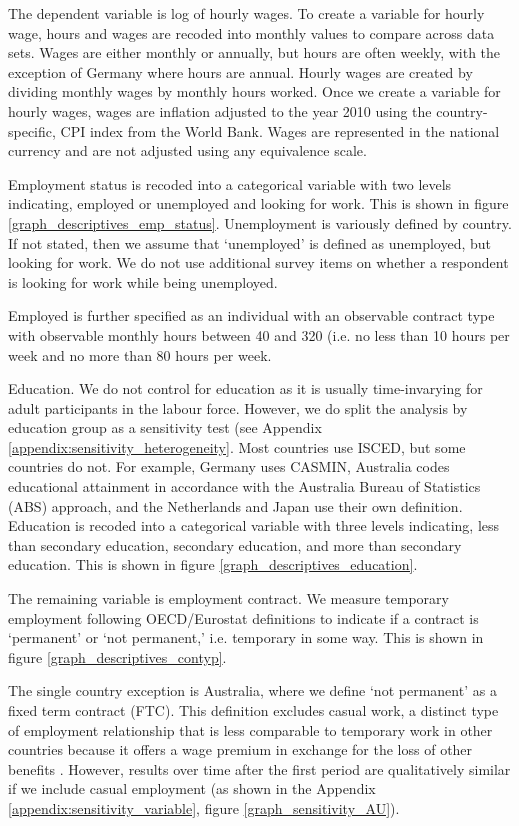 The dependent variable is log of hourly wages.  To create a variable for hourly wage, hours and wages are recoded into monthly values to compare across data sets.  Wages are either monthly or annually, but hours are often weekly, with the exception of Germany where hours are annual.  Hourly wages are created by dividing monthly wages by monthly hours worked.    Once we create a variable for hourly wages, wages are inflation adjusted to the year 2010 using the country-specific, CPI index from the World Bank.  Wages are represented in the national currency and are not adjusted using any equivalence scale.  

Employment status is recoded into a categorical variable with two levels indicating, employed or unemployed and looking for work.  This is shown in figure \ref{graph_descriptives_emp_status}.  Unemployment is variously defined by country.  If not stated, then we assume that `unemployed' is defined as unemployed, but looking for work.  We do not use additional survey items on whether a respondent is looking for work while being unemployed.  

Employed is further specified as an individual with an observable contract type with observable monthly hours between 40 and 320 (i.e. no less than 10 hours per week and no more than 80 hours per week.


Education.  We do not control for education as it is usually time-invarying for adult participants in the labour force.  However, we do split the analysis by education group as a sensitivity test (see Appendix \ref{appendix:sensitivity_heterogeneity}.  Most countries use ISCED, but some countries do not.  For example, Germany uses CASMIN, Australia codes educational attainment in accordance with the Australia Bureau of Statistics (ABS) approach, and the Netherlands and Japan use their own definition.  Education is recoded into a categorical variable with three levels indicating, less than secondary education, secondary education, and more than secondary education.  This is shown in figure \ref{graph_descriptives_education}.

The remaining variable is employment contract.  We measure temporary employment following OECD/Eurostat definitions to indicate if a contract is `permanent' or  `not permanent,' i.e. temporary in some way.  This is shown in figure \ref{graph_descriptives_contyp}.  

The single country exception is Australia, where we define `not permanent' as a fixed term contract (FTC).  This definition excludes casual work, a distinct type of employment relationship that is less comparable to temporary work in other countries because it offers a wage premium in exchange for the loss of other benefits \citep{mooi-reci_casual_2017}.  However, results over time after the first period are qualitatively similar if we include casual employment (as shown in the Appendix \ref{appendix:sensitivity_variable}, figure \ref{graph_sensitivity_AU}).  

